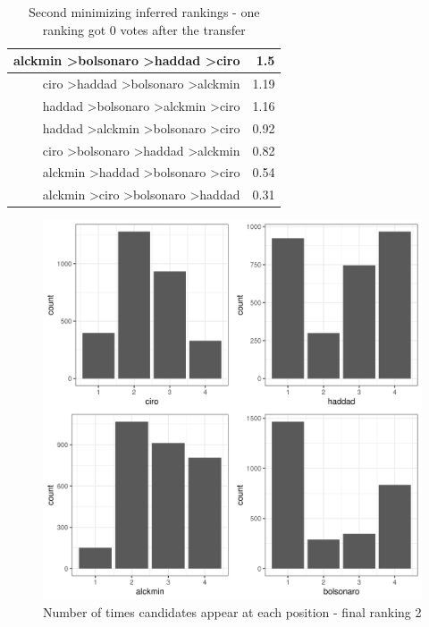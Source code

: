 \documentclass[hidelinks,11pt]{article}
\begin{document}
\begin{table}[H]
\begin{tabular}{|r|r|}
alckmin \textgreater bolsonaro \textgreater haddad \textgreater ciro & 1.5                                  \\ \hline
ciro \textgreater haddad \textgreater bolsonaro \textgreater alckmin & 1.19                                 \\ \hline
haddad \textgreater bolsonaro \textgreater alckmin \textgreater ciro & 1.16                                 \\ \hline
haddad \textgreater alckmin \textgreater bolsonaro \textgreater ciro & 0.92                                 \\ \hline
ciro \textgreater bolsonaro \textgreater haddad \textgreater alckmin & 0.82                                 \\ \hline
alckmin \textgreater haddad \textgreater bolsonaro \textgreater ciro & 0.54                                 \\ \hline
alckmin \textgreater ciro \textgreater bolsonaro \textgreater haddad & 0.31                                 \\ \hline
\end{tabular}
\caption{Second minimizing inferred rankings - one ranking got 0 votes after the transfer}
\end{table}



\begin{figure}[H]
 \centering
 \includegraphics[width=0.8\columnwidth,
 height=0.5\textheight]{./images/corrected2_indexes_plot.png}
 \caption{Number of times candidates appear at each position - final ranking 2}
\end{figure}
\end{document}
